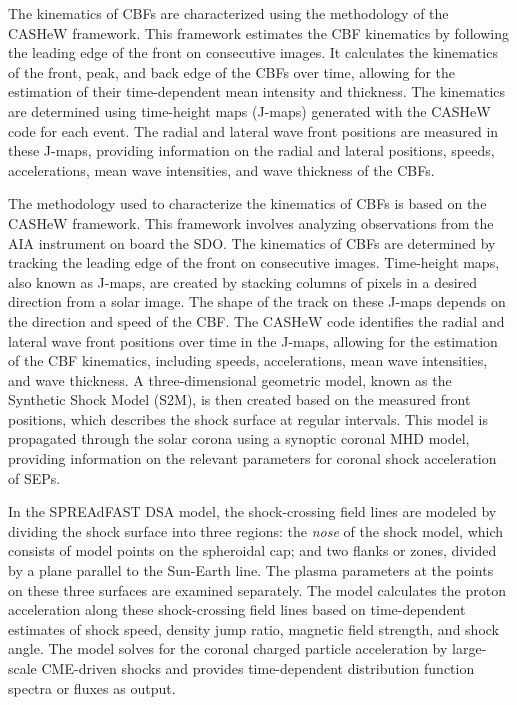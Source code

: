 The kinematics of CBFs are characterized using the methodology of the CASHeW framework. This framework estimates the CBF kinematics by following the leading edge of the front on consecutive images. It calculates the kinematics of the front, peak, and back edge of the CBFs over time, allowing for the estimation of their time-dependent mean intensity and thickness. The kinematics are determined using time-height maps (J-maps) generated with the CASHeW code for each event. The radial and lateral wave front positions are measured in these J-maps, providing information on the radial and lateral positions, speeds, accelerations, mean wave intensities, and wave thickness of the CBFs.

The methodology used to characterize the kinematics of CBFs is based on the CASHeW framework. This framework involves analyzing observations from the AIA instrument on board the SDO. The kinematics of CBFs are determined by tracking the leading edge of the front on consecutive images. Time-height maps, also known as J-maps, are created by stacking columns of pixels in a desired direction from a solar image. The shape of the track on these J-maps depends on the direction and speed of the CBF. The CASHeW code identifies the radial and lateral wave front positions over time in the J-maps, allowing for the estimation of the CBF kinematics, including speeds, accelerations, mean wave intensities, and wave thickness. A three-dimensional geometric model, known as the Synthetic Shock Model (S2M), is then created based on the measured front positions, which describes the shock surface at regular intervals. This model is propagated through the solar corona using a synoptic coronal MHD model, providing information on the relevant parameters for coronal shock acceleration of SEPs.

In the SPREAdFAST DSA model, the shock-crossing field lines are modeled by dividing the shock surface into three regions: the \textit{nose} of the shock model, which consists of model points on the spheroidal cap; and two flanks or zones, divided by a plane parallel to the Sun-Earth line. The plasma parameters at the points on these three surfaces are examined separately. The model calculates the proton acceleration along these shock-crossing field lines based on time-dependent estimates of shock speed, density jump ratio, magnetic field strength, and shock angle. The model solves for the coronal charged particle acceleration by large-scale CME-driven shocks and provides time-dependent distribution function spectra or fluxes as output.

